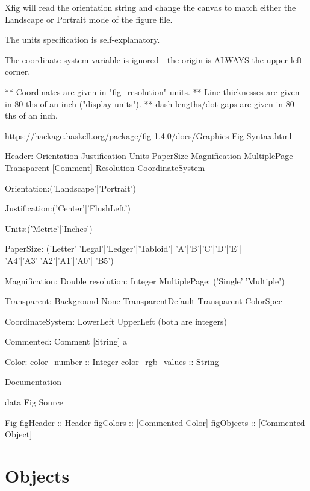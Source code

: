 \documentclass[10pt, a4paper]{article}
\begin{document}
    Xfig will read the orientation string and change the canvas to match
    either the Landscape or Portrait mode of the figure file.

    The units specification is self-explanatory.

    The coordinate-system variable is ignored - the origin is ALWAYS the
    upper-left corner.

    ** Coordinates are given in "fig\_resolution" units.
    ** Line thicknesses are given in 80-ths of an inch ("display units").
    ** dash-lengths/dot-gaps are given in 80-ths of an inch.


https://hackage.haskell.org/package/fig-1.4.0/docs/Graphics-Fig-Syntax.html



Header:
Orientation
Justification
Units
PaperSize
Magnification
MultiplePage
Transparent
[Comment]
Resolution
CoordinateSystem

Orientation:('Landscape'|'Portrait')

Justification:('Center'|'FlushLeft')

Units:('Metric'|'Inches')

PaperSize:
('Letter'|'Legal'|'Ledger'|'Tabloid'|
'A'|'B'|'C'|'D'|'E'|
'A4'|'A3'|'A2'|'A1'|'A0'|
'B5')

Magnification: Double
resolution: Integer
MultiplePage: ('Single'|'Multiple')


Transparent:
Background	 
None	 
TransparentDefault	 
Transparent ColorSpec	 


CoordinateSystem:
LowerLeft	 
UpperLeft	 
(both are integers)

Commented:
Comment [String] a	 


Color:
color\_number :: Integer
color\_rgb\_values :: String


Documentation

data Fig
Source

Fig	 
figHeader :: Header
figColors :: [Commented Color]
figObjects :: [Commented Object]


\section{Objects}\label{sec:obj}
\end{document}
